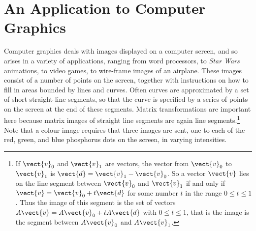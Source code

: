 \section{An Application to Computer Graphics}
\label{sec:4_5}

Computer graphics deals with images  displayed on a computer screen, and so arises in a variety of  applications, ranging from word processors, to \textit{Star Wars}  animations, to video games, to wire-frame images of an airplane.  These  images consist of a number of points on the screen, together with  instructions on how to fill in areas bounded by lines and curves. Often  curves are approximated by a set of short straight-line segments, so  that the curve is specified by a series of points on the screen at the  end of these segments. Matrix transformations are important here because  matrix images of straight line segments are again line segments.\footnote{If $\vect{v}_{0}$ and $\vect{v}_{1}$ are vectors, the vector from $\vect{v}_{0}$ to $\vect{v}_{1}$ is $\vect{d} = \vect{v}_{1} - \vect{v}_{0}$. So a vector $\vect{v}$ lies on the line segment between $\vect{v}_{0}$ and $\vect{v}_{1}$ if and only if $\vect{v} = \vect{v}_{0} + t\vect{d}$ for some number $t$ in the range $0 \leq t \leq 1$. Thus the image of this segment is the set of vectors $A\vect{v} = A\vect{v}_{0} + tA \vect{d}$ with $0 \leq t \leq 1$, that is the image is the segment between $A\vect{v}_{0}$ and $A\vect{v}_{1}$.} Note that a colour image requires that three images are sent, one to  each of the red, green, and blue phosphorus dots on the screen, in  varying intensities.

